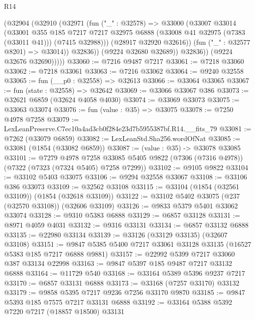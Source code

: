 \begin{lexlean}{R14}
\begin{coremodule}
                  (@32904
                    (@32910
                      (@32971
                        (fun ("_" : @32578) =>
                        @33000
                          (@33007
                            @33014
                            (@33001
                              @355
                              @185
                              @7217
                              @7217
                              @32975
                              @6888
                              (@33008 @41 @32975 (@7383 (@33011 @41)))
                              (@7415 @32988)))
                          (@28917 @32920 @32616))
                        (fun ("_" : @32577 @8201) => @33014))
                      @32836))
                  (@9224 @32680 @32689))
                @32836))
            (@9224 @32676 @32690)))))
@33060 := @7216 @9487 @7217
@33061 := @7218 @33060
@33062 := @7218 @33061
@33063 := @7216 @33062
@33064 := @9240 @32558
@33065 := fun (__p0 : @32558) => @32613
@33066 := @33064 @33065
@33067 := fun (state : @32558) => @32642
@33069 := @33066 @33067 @386
@33073 := @32621 @6859 (@32624 @4058 @4030)
@33074 := @33069 @33073
@33075 := @33063 @33074
@33076 := fun (value : @35) => @33075
@33078 := @7250 @4978 @7258
@33079 := LexLeanPreserve.C7ec10a4ad3cb0f284e23d7b5955387bf.R14.__fits_79
@33081 := @7262 (@33079 @6859)
@33082 := LexLeanStd.Sha256.wordOfNat
@33085 := @33081 (@1854 (@33082 @6859))
@33087 := (value : @35) -> @33078 @33085
@33101 := @7279
    @4978
    @7258
    @33085
    @5405
    @9822
    (@7306 (@7316 @4978))
    (@7322 (@7323 (@7324 @5405) @7258 @7299))
@33102 := @9105 @9822
@33104 := @33102 @5403 @33075
@33106 := @9294 @32558 @33067
@33108 := @33106 @386 @33073
@33109 := @32562 @33108
@33115 := @33104 (@1854 (@32561 @33109)) (@1854 (@32618 @33109))
@33122 := @33102 @5402 @33075 (@237 (@32570 @33108)) (@32606 @33109)
@33126 := @9833 @5379 @5401 @33062 @33074
@33128 := @9310 @5383 @6888
@33129 := @6857 @33128
@33131 := @8971 @4059 @4031
@33132 := @9316 @33131
@33134 := @6857 @33132 @6888
@33135 := @22980 @33134
@33139 := @33126 (@33129 @33135) (@32607 @33108)
@33151 := @9847 @5385 @5400 @7217 @33061 @33128 @33135 (@16527 @5383 @185 @7217 @6888 @9881)
@33157 := @22992 @5399 @7217 @33060 @387 @33134 @22998
@33163 := @9847 @5397 @185 @9487 @7217 @33132 @6888
@33164 := @11729 @540
@33168 := @33164 @5389 @5396 @9237 @7217
@33170 := @6857 @33131 @6888
@33173 := @33168 (@7257 @33170) @33132
@33179 := @9858 @5395 @7217 @9236 @7256 @33170 @9870
@33185 := @9847 @5393 @185 @7575 @7217 @33131 @6888
@33192 := @33164 @5388 @5392 @7220 @7217 (@18857 @18500) @33131

\end{coremodule}
\end{lexlean}
